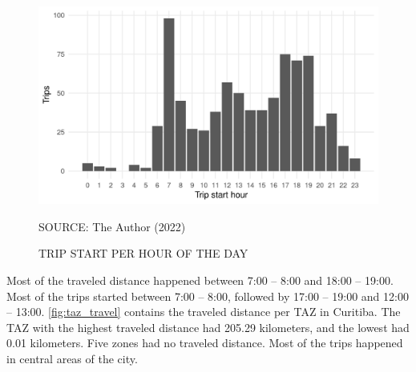\begin{figure}[!htbp]
    \centering\footnotesize
    \captionsetup{font=footnotesize}
    \caption{TRIP START PER HOUR OF THE DAY}
    \includegraphics{fig/hotd_trips.png}
    \label{fig:hotd_trips}
    \par SOURCE: The Author (2022)
\end{figure}

Most of the traveled distance happened between 7:00 – 8:00 and 18:00 – 19:00. Most of the trips started between 7:00 – 8:00, followed by 17:00 – 19:00 and 12:00 – 13:00. \autoref{fig:taz_travel} contains the traveled distance per TAZ in Curitiba. The TAZ with the highest traveled distance had 205.29 kilometers, and the lowest had 0.01 kilometers. Five zones had no traveled distance. Most of the trips happened in central areas of the city.


